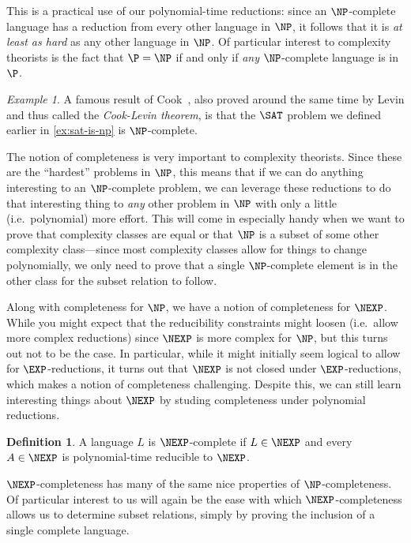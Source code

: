 \documentclass[english,12pt]{reedthesis}
\theoremstyle{plain}
\theoremstyle{definition}
\newtheorem{defn}[defn]{Definition}
\theoremstyle{remark}
\newtheorem{example}{Example}[thm]
\begin{document}
This is a practical use of our polynomial-time reductions: since an
$\NP$-complete language has a reduction from every other language in $\NP$, it
follows that it is \emph{at least as hard} as any other language in $\NP$. Of
particular interest to complexity theorists is the fact that $\P = \NP$ if and
only if \emph{any} $\NP$-complete language is in $\P$.

\begin{example}\label{ex:sat-is-complete}
  A famous result of Cook~\cite{Cook71}, also proved around the same time by
  Levin and thus called the \emph{Cook-Levin theorem}, is that the $\SAT$
  problem we defined earlier in \cref{ex:sat-is-np} is $\NP$-complete.
\end{example}

The notion of completeness is very important to complexity theorists. Since
these are the ``hardest'' problems in $\NP$, this means that if we can do
anything interesting to an $\NP$-complete problem, we can leverage these
reductions to do that interesting thing to \emph{any} other problem in $\NP$
with only a little (i.e.\ polynomial) more effort. This will come in especially
handy when we want to prove that complexity classes are equal or that $\NP$ is a
subset of some other complexity class---since most complexity classes allow for
things to change polynomially, we only need to prove that a single
$\NP$-complete element is in the other class for the subset relation to follow.

Along with completeness for $\NP$, we have a notion of completeness for $\NEXP$.
While you might expect that the reducibility constraints might loosen (i.e.\
allow more complex reductions) since $\NEXP$ is more complex for $\NP$, but this
turns out not to be the case. In particular, while it might initially seem
logical to allow for $\EXP$-reductions, it turns out that $\NEXP$ is not closed
under $\EXP$-reductions, which makes a notion of completeness challenging.
Despite this, we can still learn interesting things about $\NEXP$ by studing
completeness under polynomial reductions.

\begin{defn}\label{def:nexp-complete}
  A language $L$ is $\NEXP$-complete if $L \in \NEXP$ and every $A \in \NEXP$ is
  polynomial-time reducible to $\NEXP$.
\end{defn}

$\NEXP$-completeness has many of the same nice properties of $\NP$-completeness.
Of particular interest to us will again be the ease with which
$\NEXP$-completeness allows us to determine subset relations, simply by proving
the inclusion of a single complete language.
\end{document}
